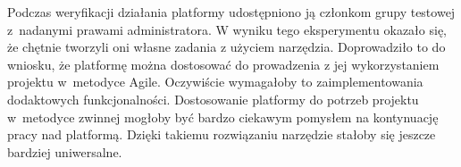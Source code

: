 Podczas weryfikacji działania platformy udostępniono ją członkom grupy testowej z~nadanymi prawami administratora.
W wyniku tego eksperymentu okazało się, że chętnie tworzyli oni własne zadania z użyciem narzędzia.
Doprowadziło to do wniosku, że platformę można dostosować do prowadzenia z jej wykorzystaniem projektu w~metodyce Agile.
Oczywiście wymagałoby to zaimplementowania dodaktowych funkcjonalności.
Dostosowanie platformy do potrzeb projektu w~metodyce zwinnej mogłoby być bardzo ciekawym pomysłem na kontynuację pracy nad platformą.
Dzięki takiemu rozwiązaniu narzędzie stałoby się jeszcze bardziej uniwersalne.






